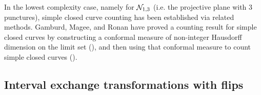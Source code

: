 In the lowest complexity case, namely for $\mathcal{N}_{1,3}$ (i.e. the projective plane with $3$ punctures), simple closed curve counting has been established via related methods.
Gamburd, Magee, and Ronan have proved a counting result for simple closed curves by constructing a conformal measure of non-integer Hausdorff dimension on the limit set (\cite[Theorem 10]{10.4007/annals.2019.190.3.2}), and then using that conformal measure to count simple closed curves (\cite[Theorem 2]{10.1093/imrn/rny112}).





\subsection*{Interval exchange transformations with flips}

